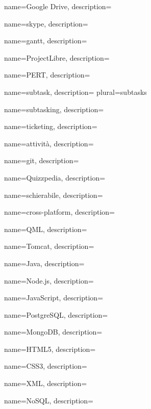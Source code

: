  {
	name=Google Drive,
	description={\TODO{}}
}

 {
	name=skype,
	description={\TODO{}}
}

 {
	name=gantt,
	description={\TODO{}}
}

 {
	name=ProjectLibre,
	description={\TODO{}}
}

 {
	name=PERT,
	description={\TODO{}}
}

 {
	name=subtask,
	description={\TODO{}}
	plural=subtasks
}

 {
	name=subtasking,
	description={\TODO{}}
}

 {
	name=ticketing,
	description={\TODO{}}
}

 {
	name=attività,
	description={\TODO{}}
}

 {
	name=git,
	description={\TODO{}}
}

 {
	name=Quizzpedia,
	description={\TODO{}}
}

 {
	name=schierabile,
	description={\TODO{}}
}

 {
	name=cross-platform,
	description={\TODO{}}
}

 {
	name=QML,
	description={\TODO{}}
}

 {
	name=Tomcat,
	description={\TODO{}}
}

 {
	name=Java,
	description={\TODO{}}
}

 {
	name=Node.js,
	description={\TODO{}}
}

 {
	name=JavaScript,
	description={\TODO{}}
}

 {
	name=PostgreSQL,
	description={\TODO{}}
}

 {
	name=MongoDB,
	description={\TODO{}}
}

 {
	name=HTML5,
	description={\TODO{}}
}

 {
	name=CSS3,
	description={\TODO{}}
}

 {
	name=XML,
	description={\TODO{}}
}

 {
	name=NoSQL,
	description={\TODO{}}
}

